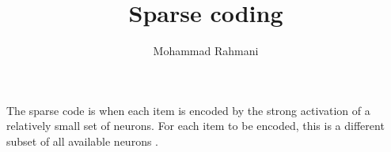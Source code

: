 \documentclass[a4paper]{article}
\title{Sparse coding}
\date{}
\author{Mohammad Rahmani}
\begin{document}
\maketitle
    The sparse code is when each item is encoded by the strong activation of a relatively small set of neurons. For each item to be encoded, this is a different subset of all available neurons .
    
    
\end{document}
